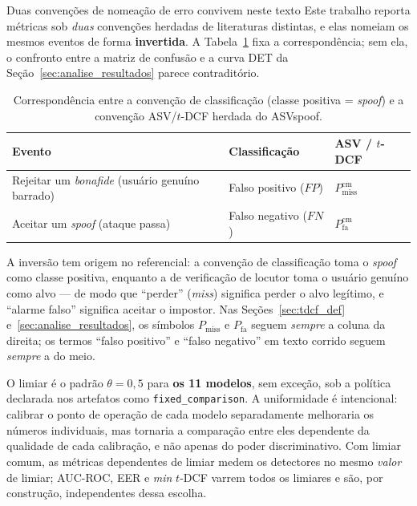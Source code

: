 \documentclass[12pt,a4paper]{article}
\begin{document}
\begin{warningbox}{Duas convenções de nomeação de erro convivem neste texto}
	Este trabalho reporta métricas sob \emph{duas} convenções herdadas de
	literaturas distintas, e elas nomeiam os mesmos eventos de forma
	\textbf{invertida}. A Tabela~\ref{tab:convencoes_erro} fixa a correspondência;
	sem ela, o confronto entre a matriz de confusão e a curva DET da
	Seção~\ref{sec:analise_resultados} parece contraditório.
	
	\begin{table}[H]
		\centering
		\caption[Convenções de classificação e de erro ASV/$t$-DCF.]{Correspondência entre a convenção de classificação (classe positiva =
			\textit{spoof}) e a convenção ASV/$t$-DCF herdada do ASVspoof.}
		\label{tab:convencoes_erro}
		\small\singlespacing
		\begin{tabular}{@{}>{\raggedright\arraybackslash}p{4.6cm}
				>{\raggedright\arraybackslash}p{3.4cm}
				>{\raggedright\arraybackslash}p{4.2cm}@{}}
			\toprule
			\textbf{Evento} & \textbf{Classificação} & \textbf{ASV / $t$-DCF} \\
			\midrule
			Rejeitar um \textit{bonafide} (usuário genuíno barrado)
			& Falso positivo ($FP$)
			& $P_{\mathrm{miss}}^{\mathrm{cm}}$ \\
			\addlinespace
			Aceitar um \textit{spoof} (ataque passa)
			& Falso negativo ($FN$)
			& $P_{\mathrm{fa}}^{\mathrm{cm}}$ \\
			\bottomrule
		\end{tabular}
	\end{table}
	
	\noindent
	A inversão tem origem no referencial: a convenção de classificação toma o
	\textit{spoof} como classe positiva, enquanto a de verificação de locutor toma
	o usuário genuíno como alvo --- de modo que ``perder'' (\textit{miss}) significa
	perder o alvo legítimo, e ``alarme falso'' significa aceitar o impostor. Nas
	Seções~\ref{sec:tdcf_def} e~\ref{sec:analise_resultados}, os símbolos
	$P_{\mathrm{miss}}$ e $P_{\mathrm{fa}}$ seguem \emph{sempre} a coluna da
	direita; os termos ``falso positivo'' e ``falso negativo'' em texto corrido
	seguem \emph{sempre} a do meio.
\end{warningbox}

O limiar é o padrão $\theta = 0{,}5$ para \textbf{os \num{11} modelos}, sem
exceção, sob a política declarada nos artefatos como
\texttt{fixed\_comparison}. A uniformidade é intencional: calibrar o ponto de
operação de cada modelo separadamente melhoraria os números individuais, mas
tornaria a comparação entre eles dependente da qualidade de cada calibração, e
não apenas do poder discriminativo. Com limiar comum, as métricas dependentes
de limiar medem os detectores no mesmo \emph{valor} de limiar; AUC-ROC, EER e
\textit{min} $t$-DCF varrem todos os limiares e são, por construção,
independentes dessa escolha.
\end{document}
